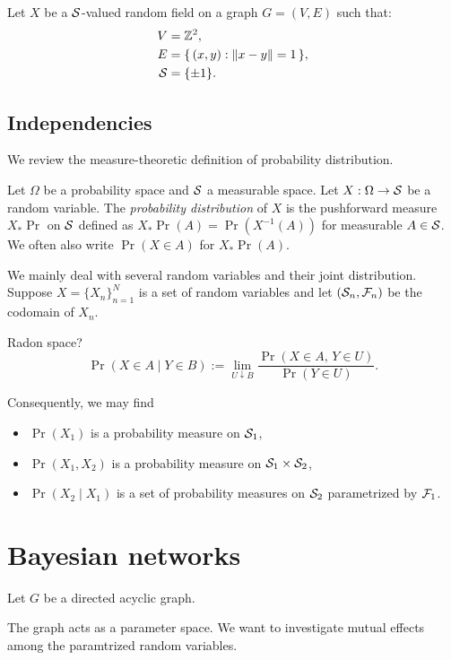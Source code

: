 \documentclass{../exp}
\begin{document}
\begin{ex}
Let $X$ be a $\mathcal{S}$-valued random field on a graph $G=(V,E)$ such that:
\begin{align*}
V&=\mathbb{Z}^2,\\
E&=\{\,(x,y):\|x-y\|=1\,\},\\
\mathcal{S}&=\{\pm1\}.
\end{align*}
\end{ex}


\subsection{Independencies}

We review the measure-theoretic definition of probability distribution.
\begin{defn}
Let $\Omega$ be a probability space and $\mathcal{S}$ a measurable space.
Let $X:\Omega\to\cS$ be a random variable.
The \emph{probability distribution} of $X$ is the pushforward measure $X_*\Pr$ on $\mathcal{S}$ defined as $X_*\Pr(A)=\Pr(X^{-1}(A))$ for measurable $A\in\mathcal{S}$.
We often also write $\Pr(X\in A)$ for $X_*\Pr(A)$.
\end{defn}

We mainly deal with several random variables and their joint distribution.
Suppose $X=\{X_n\}_{n=1}^N$ is a set of random variables and let $(\mathcal{S}_n,\mathcal{F}_n)$ be the codomain of $X_n$.
\begin{defn}
Radon space?
\[\Pr(X\in A\mid Y\in B):=\lim_{U\downarrow B}\frac{\Pr(X\in A,\,Y\in U)}{\Pr(Y\in U)}.\]
\end{defn}


Consequently, we may find
\begin{itemize}
\item $\Pr(X_1)$ is a probability measure on $\mathcal{S}_1$,
\item $\Pr(X_1,X_2)$ is a probability measure on $\mathcal{S}_1\times\mathcal{S}_2$,
\item $\Pr(X_2\mid X_1)$ is a set of probability measures on $\mathcal{S}_2$ parametrized by $\mathcal{F}_1$.
\end{itemize}




\section{Bayesian networks}


\begin{defn}
Let $G$ be a directed acyclic graph.
\end{defn}
The graph acts as a parameter space.
We want to investigate mutual effects among the paramtrized random variables.
\begin{thm}

\end{thm}
\end{document}
